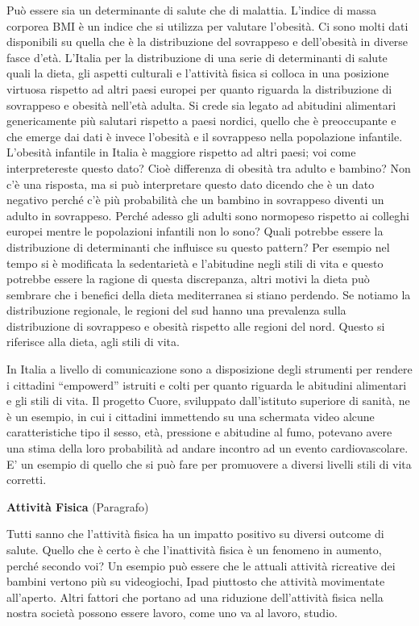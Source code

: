 \documentclass[]{article}
\begin{document}
Può essere sia un determinante di salute che di malattia. L'indice di
massa corporea BMI è un indice che si utilizza per valutare l'obesità.
Ci sono molti dati disponibili su quella che è la distribuzione del
sovrappeso e dell'obesità in diverse fasce d'età. L'Italia per la
distribuzione di una serie di determinanti di salute quali la dieta, gli
aspetti culturali e l'attività fisica si colloca in una posizione
virtuosa rispetto ad altri paesi europei per quanto riguarda la
distribuzione di sovrappeso e obesità nell'età adulta. Si crede sia
legato ad abitudini alimentari genericamente più salutari rispetto a
paesi nordici, quello che è preoccupante e che emerge dai dati è invece
l'obesità e il sovrappeso nella popolazione infantile. L'obesità
infantile in Italia è maggiore rispetto ad altri paesi; voi come
interpretereste questo dato? Cioè differenza di obesità tra adulto e
bambino? Non c'è una risposta, ma si può interpretare questo dato
dicendo che è un dato negativo perché c'è più probabilità che un bambino
in sovrappeso diventi un adulto in sovrappeso. Perché adesso gli adulti
sono normopeso rispetto ai colleghi europei mentre le popolazioni
infantili non lo sono? Quali potrebbe essere la distribuzione di
determinanti che influisce su questo pattern? Per esempio nel tempo si è
modificata la sedentarietà e l'abitudine negli stili di vita e questo
potrebbe essere la ragione di questa discrepanza, altri motivi la dieta
può sembrare che i benefici della dieta mediterranea si stiano perdendo.
Se notiamo la distribuzione regionale, le regioni del sud hanno una
prevalenza sulla distribuzione di sovrappeso e obesità rispetto alle
regioni del nord. Questo si riferisce alla dieta, agli stili di vita.

In Italia a livello di comunicazione sono a disposizione degli strumenti
per rendere i cittadini ``empowerd'' istruiti e colti per quanto
riguarda le abitudini alimentari e gli stili di vita. Il progetto Cuore,
sviluppato dall'istituto superiore di sanità, ne è un esempio, in cui i
cittadini immettendo su una schermata video alcune caratteristiche tipo
il sesso, età, pressione e abitudine al fumo, potevano avere una stima
della loro probabilità ad andare incontro ad un evento cardiovascolare.
E' un esempio di quello che si può fare per promuovere a diversi livelli
stili di vita corretti.

\textbf{Attività Fisica} (Paragrafo)

Tutti sanno che l'attività fisica ha un impatto positivo su diversi
outcome di salute. Quello che è certo è che l'inattività fisica è un
fenomeno in aumento, perché secondo voi? Un esempio può essere che le
attuali attività ricreative dei bambini vertono più su videogiochi, Ipad
piuttosto che attività movimentate all'aperto. Altri fattori che portano
ad una riduzione dell'attività fisica nella nostra società possono
essere lavoro, come uno va al lavoro, studio.
\end{document}
